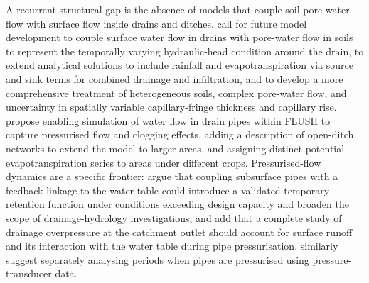 \documentclass[11pt]{article}
\begin{document}
A recurrent structural gap is the absence of models that couple soil
pore-water flow with surface flow inside drains and ditches.
\textcite{Xin2016b} call for future model development to couple surface water
flow in drains with pore-water flow in soils to represent the temporally
varying hydraulic-head condition around the drain, to extend analytical
solutions to include rainfall and evapotranspiration via source and sink terms
for combined drainage and infiltration, and to develop a more comprehensive
treatment of heterogeneous soils, complex pore-water flow, and uncertainty in
spatially variable capillary-fringe thickness and capillary rise.
\textcite{Nousiainen2015} propose enabling simulation of water flow in drain
pipes within FLUSH to capture pressurised flow and clogging effects, adding a
description of open-ditch networks to extend the model to larger areas, and
assigning distinct potential-evapotranspiration series to areas under
different crops. Pressurised-flow dynamics are a specific frontier:
\textcite{Henine2010} argue that coupling subsurface pipes with a feedback
linkage to the water table could introduce a validated temporary-retention
function under conditions exceeding design capacity and broaden the scope of
drainage-hydrology investigations, and \textcite{Henine2014} add that a
complete study of drainage overpressure at the catchment outlet should account
for surface runoff and its interaction with the water table during pipe
pressurisation. \textcite{Saadat2018} similarly suggest separately analysing
periods when pipes are pressurised using pressure-transducer data.
\end{document}
